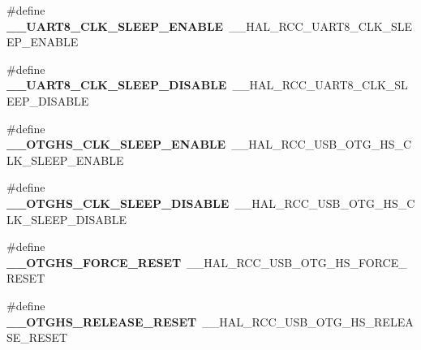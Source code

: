\begin{DoxyCompactItemize}
\item 
\hypertarget{group___h_a_l___r_c_c___aliased_ga75ecbea6d7f140ed4600d5759aca2757}{\#define {\bfseries \-\_\-\-\_\-\-U\-A\-R\-T8\-\_\-\-C\-L\-K\-\_\-\-S\-L\-E\-E\-P\-\_\-\-E\-N\-A\-B\-L\-E}~\-\_\-\-\_\-\-H\-A\-L\-\_\-\-R\-C\-C\-\_\-\-U\-A\-R\-T8\-\_\-\-C\-L\-K\-\_\-\-S\-L\-E\-E\-P\-\_\-\-E\-N\-A\-B\-L\-E}\label{group___h_a_l___r_c_c___aliased_ga75ecbea6d7f140ed4600d5759aca2757}

\item 
\hypertarget{group___h_a_l___r_c_c___aliased_ga030bdf79bf7818a7a086504731c958a0}{\#define {\bfseries \-\_\-\-\_\-\-U\-A\-R\-T8\-\_\-\-C\-L\-K\-\_\-\-S\-L\-E\-E\-P\-\_\-\-D\-I\-S\-A\-B\-L\-E}~\-\_\-\-\_\-\-H\-A\-L\-\_\-\-R\-C\-C\-\_\-\-U\-A\-R\-T8\-\_\-\-C\-L\-K\-\_\-\-S\-L\-E\-E\-P\-\_\-\-D\-I\-S\-A\-B\-L\-E}\label{group___h_a_l___r_c_c___aliased_ga030bdf79bf7818a7a086504731c958a0}

\item 
\hypertarget{group___h_a_l___r_c_c___aliased_ga7aa05a4c64e6d307e0538338cb5346ae}{\#define {\bfseries \-\_\-\-\_\-\-O\-T\-G\-H\-S\-\_\-\-C\-L\-K\-\_\-\-S\-L\-E\-E\-P\-\_\-\-E\-N\-A\-B\-L\-E}~\-\_\-\-\_\-\-H\-A\-L\-\_\-\-R\-C\-C\-\_\-\-U\-S\-B\-\_\-\-O\-T\-G\-\_\-\-H\-S\-\_\-\-C\-L\-K\-\_\-\-S\-L\-E\-E\-P\-\_\-\-E\-N\-A\-B\-L\-E}\label{group___h_a_l___r_c_c___aliased_ga7aa05a4c64e6d307e0538338cb5346ae}

\item 
\hypertarget{group___h_a_l___r_c_c___aliased_ga77eea2dcfeb357b89e47b20498fec495}{\#define {\bfseries \-\_\-\-\_\-\-O\-T\-G\-H\-S\-\_\-\-C\-L\-K\-\_\-\-S\-L\-E\-E\-P\-\_\-\-D\-I\-S\-A\-B\-L\-E}~\-\_\-\-\_\-\-H\-A\-L\-\_\-\-R\-C\-C\-\_\-\-U\-S\-B\-\_\-\-O\-T\-G\-\_\-\-H\-S\-\_\-\-C\-L\-K\-\_\-\-S\-L\-E\-E\-P\-\_\-\-D\-I\-S\-A\-B\-L\-E}\label{group___h_a_l___r_c_c___aliased_ga77eea2dcfeb357b89e47b20498fec495}

\item 
\hypertarget{group___h_a_l___r_c_c___aliased_gaec3f4bab1369b3387a356f9b6cd72e4e}{\#define {\bfseries \-\_\-\-\_\-\-O\-T\-G\-H\-S\-\_\-\-F\-O\-R\-C\-E\-\_\-\-R\-E\-S\-E\-T}~\-\_\-\-\_\-\-H\-A\-L\-\_\-\-R\-C\-C\-\_\-\-U\-S\-B\-\_\-\-O\-T\-G\-\_\-\-H\-S\-\_\-\-F\-O\-R\-C\-E\-\_\-\-R\-E\-S\-E\-T}\label{group___h_a_l___r_c_c___aliased_gaec3f4bab1369b3387a356f9b6cd72e4e}

\item 
\hypertarget{group___h_a_l___r_c_c___aliased_ga5ef24faa523bf384944f24d3f151b730}{\#define {\bfseries \-\_\-\-\_\-\-O\-T\-G\-H\-S\-\_\-\-R\-E\-L\-E\-A\-S\-E\-\_\-\-R\-E\-S\-E\-T}~\-\_\-\-\_\-\-H\-A\-L\-\_\-\-R\-C\-C\-\_\-\-U\-S\-B\-\_\-\-O\-T\-G\-\_\-\-H\-S\-\_\-\-R\-E\-L\-E\-A\-S\-E\-\_\-\-R\-E\-S\-E\-T}\label{group___h_a_l___r_c_c___aliased_ga5ef24faa523bf384944f24d3f151b730}


\end{DoxyCompactItemize}
